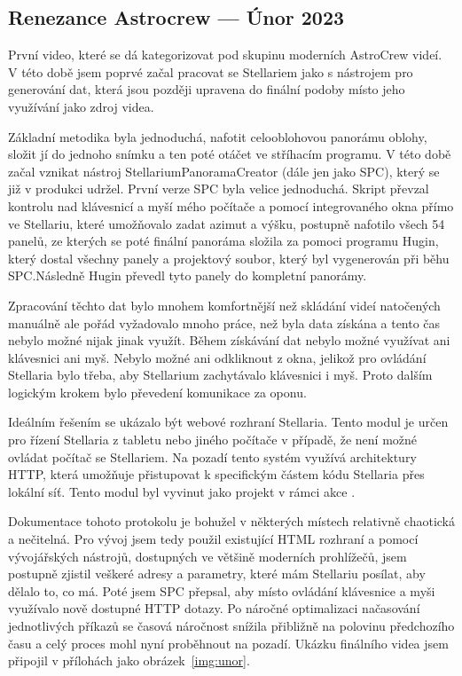 \documentclass[12pt,a4paper,titlepage]{article}
\begin{document}
\subsection{Renezance Astrocrew --- Únor 2023}
První video, které se dá kategorizovat pod skupinu moderních AstroCrew videí. V této době jsem poprvé začal pracovat se Stellariem jako s nástrojem pro generování dat, která jsou později upravena do finální podoby místo jeho využívání jako zdroj videa. 

Základní metodika byla jednoduchá, nafotit celooblohovou panorámu oblohy, složit jí do jednoho snímku a ten poté otáčet ve stříhacím programu. V této době začal vznikat nástroj StellariumPanoramaCreator (dále jen jako SPC), který se již v produkci udržel. První verze SPC byla velice jednoduchá. Skript převzal kontrolu nad klávesnicí a myší mého počítače a pomocí integrovaného okna přímo ve Stellariu, které umožňovalo zadat azimut a výšku, postupně nafotilo všech 54 panelů, ze kterých se poté finální panoráma složila za pomoci programu Hugin, který dostal všechny panely a projektový soubor, který byl vygenerován při běhu SPC.\@ Následně Hugin převedl tyto panely do kompletní panorámy.

Zpracování těchto dat bylo mnohem komfortnější než skládání videí natočených manuálně ale pořád vyžadovalo mnoho práce, než byla data získána a tento čas nebylo možné nijak jinak využít. Během získávání dat nebylo možné využívat ani klávesnici ani myš. Nebylo možné ani odkliknout z okna, jelikož pro ovládání Stellaria bylo třeba, aby Stellarium zachytávalo klávesnici i myš. Proto dalším logickým krokem bylo převedení komunikace za oponu. 

Ideálním řešením se ukázalo být webové rozhraní Stellaria. Tento modul je určen pro řízení Stellaria z tabletu nebo jiného počítače v případě, že není možné ovládat počítač se Stellariem. Na pozadí tento systém využívá architektury HTTP, která umožňuje přistupovat k specifickým částem kódu Stellaria přes lokální síť. Tento modul byl vyvinut jako projekt v rámci akce . 

Dokumentace tohoto protokolu je bohužel v některých místech relativně chaotická a nečitelná. Pro vývoj jsem tedy použil existující HTML rozhraní a pomocí vývojářských nástrojů, dostupných ve většině moderních prohlížečů, jsem postupně zjistil veškeré adresy a parametry, které mám Stellariu posílat, aby dělalo to, co má. Poté jsem SPC přepsal, aby místo ovládání klávesnice a myši využívalo nově dostupné HTTP dotazy. Po náročné optimalizaci načasování jednotlivých příkazů se časová náročnost snížila přibližně na polovinu předchozího času a celý proces mohl nyní proběhnout na pozadí. Ukázku finálního videa jsem připojil v přílohách jako obrázek~\ref{img:unor}.
\end{document}
